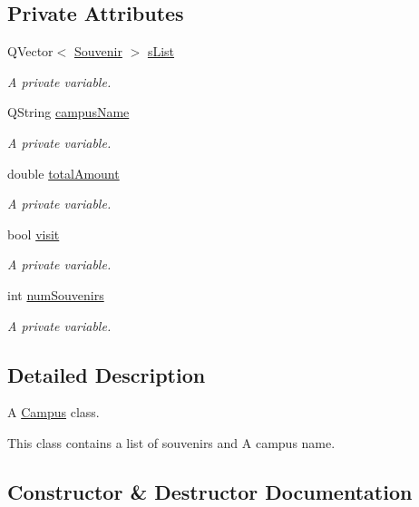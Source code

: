 \subsection*{Private Attributes}
\begin{DoxyCompactItemize}
\item 
Q\+Vector$<$ \hyperlink{class_souvenir}{Souvenir} $>$ \hyperlink{class_campus_a9223f6e8d47eaf31cb611629a14ac855}{s\+List}
\begin{DoxyCompactList}\small\item\em A private variable. \end{DoxyCompactList}\item 
Q\+String \hyperlink{class_campus_afdffffedc0ba5ead586c44545cd5528b}{campus\+Name}
\begin{DoxyCompactList}\small\item\em A private variable. \end{DoxyCompactList}\item 
double \hyperlink{class_campus_aa487dfe37b790362d7c7ee35d0806544}{total\+Amount}
\begin{DoxyCompactList}\small\item\em A private variable. \end{DoxyCompactList}\item 
bool \hyperlink{class_campus_aa569a21d95e1b865b6bf6c2961a9630a}{visit}
\begin{DoxyCompactList}\small\item\em A private variable. \end{DoxyCompactList}\item 
int \hyperlink{class_campus_a996a6e6575b6421616b7bc639b778b29}{num\+Souvenirs}
\begin{DoxyCompactList}\small\item\em A private variable. \end{DoxyCompactList}\end{DoxyCompactItemize}


\subsection{Detailed Description}
A \hyperlink{class_campus}{Campus} class. 

This class contains a list of souvenirs and A campus name. 

\subsection{Constructor \& Destructor Documentation}
\mbox{\label{class_campus_abda28c16930a310df27f2f47fc5e15b1}} 
